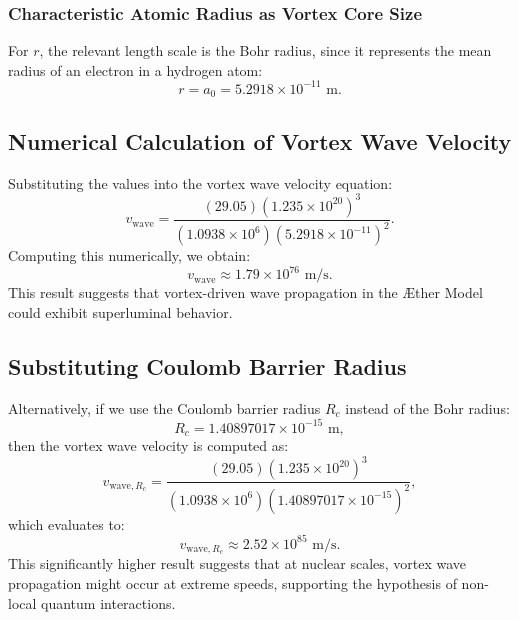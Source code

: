     \subsubsection*{Characteristic Atomic Radius as Vortex Core Size}
    For $r$, the relevant length scale is the Bohr radius, since it represents the mean radius of an electron in a hydrogen atom:
    \begin{equation*}
        r = a_0 = 5.2918 \times 10^{-11} \text{ m}.
    \end{equation*}

    \subsection*{Numerical Calculation of Vortex Wave Velocity}
    Substituting the values into the vortex wave velocity equation:
    \begin{equation*}
        v_\text{wave} = \frac{(29.05) (1.235 \times 10^{20})^3}{(1.0938 \times 10^6) (5.2918 \times 10^{-11})^2}.
    \end{equation*}
    Computing this numerically, we obtain:
    \begin{equation*}
        v_\text{wave} \approx 1.79 \times 10^{76} \text{ m/s}.
    \end{equation*}
    This result suggests that vortex-driven wave propagation in the Æther Model could exhibit superluminal behavior.

    \subsection*{Substituting Coulomb Barrier Radius}
    Alternatively, if we use the Coulomb barrier radius $R_c$ instead of the Bohr radius:
    \begin{equation*}
        R_c = 1.40897017 \times 10^{-15} \text{ m},
    \end{equation*}
    then the vortex wave velocity is computed as:
    \begin{equation*}
        v_{\text{wave}, R_c} = \frac{(29.05) (1.235 \times 10^{20})^3}{(1.0938 \times 10^6) (1.40897017 \times 10^{-15})^2},
    \end{equation*}
    which evaluates to:
    \begin{equation*}
        v_{\text{wave}, R_c} \approx 2.52 \times 10^{85} \text{ m/s}.
    \end{equation*}
    This significantly higher result suggests that at nuclear scales, vortex wave propagation might occur at extreme speeds, supporting the hypothesis of non-local quantum interactions.